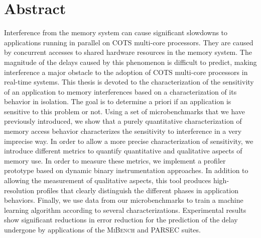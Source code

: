 \chapter{Abstract}


Interference from the memory system can cause significant slowdowns to applications running in parallel on COTS multi-core processors.
They are caused by concurrent accesses to shared hardware resources in the memory system.
The magnitude of the delays caused by this phenomenon is difficult to predict, making interference a major obstacle to the adoption of COTS multi-core processors in real-time systems.
This thesis is devoted to the characterization of the sensitivity of an application to memory interferences based on a characterization of its behavior in isolation.
The goal is to determine a priori if an application is sensitive to this problem or not.
Using a set of microbenchmarks that we have previously introduced, we show that a purely quantitative characterization of memory access behavior characterizes the sensitivity to interference in a very imprecise way.
In order to allow a more precise characterization of sensitivity, we introduce different metrics to quantify quantitative and qualitative aspects of memory use.
In order to measure these metrics, we implement a profiler prototype based on dynamic binary instrumentation approaches.
In addition to allowing the measurement of qualitative aspects, this tool produces high-resolution profiles that clearly distinguish the different phases in application behaviors.
Finally, we use data from our microbenchmarks to train a machine learning algorithm according to several characterizations.
Experimental results show significant reductions in error reduction for the prediction of the delay undergone by applications of the \textsc{MiBench} and \textsc{PARSEC} suites.
